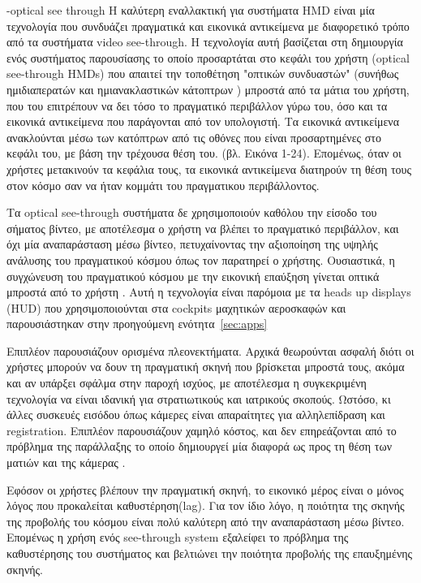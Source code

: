 -optical see through
Η καλύτερη εναλλακτική για συστήματα HMD είναι μία τεχνολογία που συνδυάζει πραγματικά και εικονικά αντικείμενα με διαφορετικό τρόπο από τα συστήματα video see-through. Η τεχνολογία αυτή βασίζεται στη δημιουργία ενός συστήματος παρουσίασης το οποίο προσαρτάται στο κεφάλι του χρήστη (optical see-through HMDs) που απαιτεί την τοποθέτηση "οπτικών συνδυαστών" (συνήθως ημιδιαπερατών και ημιανακλαστικών κάτοπτρων ) μπροστά από τα μάτια του χρήστη, που του επιτρέπουν να δει τόσο το πραγματικό περιβάλλον γύρω του, όσο και τα εικονικά αντικείμενα που παράγονται από τον υπολογιστή. 
Τα εικονικά αντικείμενα ανακλούνται μέσω των κατόπτρων από τις οθόνες που είναι προσαρτημένες στο κεφάλι του, με βάση την τρέχουσα θέση του. (βλ. Εικόνα 1-24).  Επομένως, όταν οι χρήστες μετακινούν τα κεφάλια τους, τα εικονικά αντικείμενα διατηρούν τη θέση τους στον κόσμο σαν να ήταν κομμάτι του πραγματικου περιβάλλοντος.




Τα optical see-through συστήματα δε χρησιμοποιούν καθόλου την είσοδο του σήματος βίντεο, με αποτέλεσμα ο χρήστη να βλέπει το πραγματικό περιβάλλον, και όχι μία αναπαράσταση μέσω βίντεο, πετυχαίνοντας την αξιοποίηση της υψηλής ανάλυσης του πραγματικού κόσμου όπως τον παρατηρεί ο χρήστης. Ουσιαστικά, η συγχώνευση του πραγματικού κόσμου με την εικονική επαύξηση γίνεται οπτικά μπροστά από το χρήστη \cite{Vallino1998} . Αυτή η τεχνολογία είναι παρόμοια με τα  heads up displays (HUD) που χρησιμοποιούνται στα cockpits μαχητικών αεροσκαφών και παρουσιάστηκαν στην προηγούμενη ενότητα~\ref{sec:apps}

Επιπλέον παρουσιάζουν ορισμένα πλεονεκτήματα. Αρχικά θεωρούνται ασφαλή διότι οι χρήστες μπορούν να δουν τη πραγματική σκηνή που βρίσκεται μπροστά τους, ακόμα και αν υπάρξει σφάλμα στην παροχή ισχύος, με αποτέλεσμα η συγκεκριμένη τεχνολογία να είναι ιδανική για στρατιωτικούς και ιατρικούς σκοπούς. Ωστόσο, κι άλλες συσκευές εισόδου όπως κάμερες είναι απαραίτητες για αλληλεπίδραση και registration. Επιπλέον παρουσιάζουν χαμηλό κόστος, και δεν επηρεάζονται από το πρόβλημα της παράλλαξης το οποίο δημιουργεί μία διαφορά ως προς τη θέση των ματιών και της κάμερας \cite{krevelen2010} .


Εφόσον οι χρήστες βλέπουν την πραγματική σκηνή, το εικονικό μέρος είναι ο μόνος λόγος που προκαλείται καθυστέρηση(lag). Για τον ίδιο λόγο, η ποιότητα της σκηνής της προβολής του κόσμου είναι πολύ καλύτερη από την αναπαράσταση μέσω βίντεο. Επομένως η χρήση ενός see-through system εξαλείφει το πρόβλημα της καθυστέρησης του συστήματος και βελτιώνει την ποιότητα προβολής της επαυξημένης σκηνής. 


